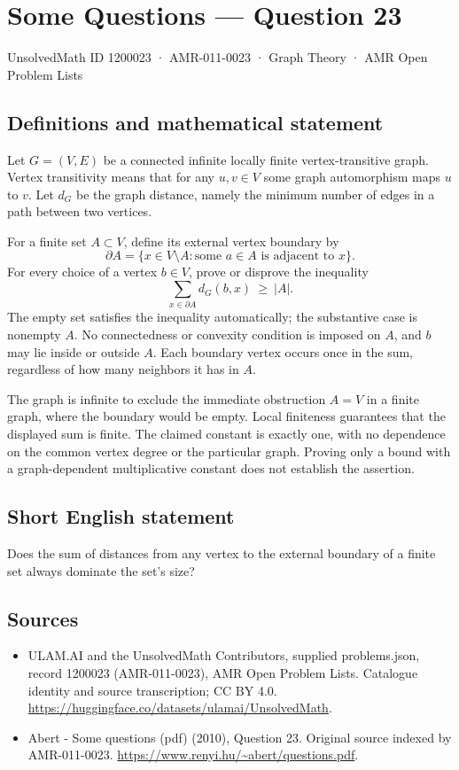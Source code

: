 \documentclass[11pt,a4paper]{article}
\begin{document}
\section*{Some Questions — Question 23}\label{1200023}
{\small UnsolvedMath ID 1200023 · AMR-011-0023 · Graph Theory · AMR Open Problem Lists}
\subsection{Definitions and mathematical statement}
Let $G=(V,E)$ be a connected infinite locally finite vertex-transitive graph. Vertex transitivity means that for any $u,v\in V$ some graph automorphism maps $u$ to $v$. Let $d_G$ be the graph distance, namely the minimum number of edges in a path between two vertices.

For a finite set $A\subset V$, define its external vertex boundary by
\[
 \partial A=\{x\in V\setminus A:\text{some }a\in A\text{ is adjacent to }x\}.
\]
For every choice of a vertex $b\in V$, prove or disprove the inequality
\[
 \sum_{x\in\partial A}d_G(b,x)\ \geq\ |A|.
\]
The empty set satisfies the inequality automatically; the substantive case is nonempty $A$. No connectedness or convexity condition is imposed on $A$, and $b$ may lie inside or outside $A$. Each boundary vertex occurs once in the sum, regardless of how many neighbors it has in $A$.

The graph is infinite to exclude the immediate obstruction $A=V$ in a finite graph, where the boundary would be empty. Local finiteness guarantees that the displayed sum is finite. The claimed constant is exactly one, with no dependence on the common vertex degree or the particular graph. Proving only a bound with a graph-dependent multiplicative constant does not establish the assertion.
\subsection{Short English statement}
Does the sum of distances from any vertex to the external boundary of a finite set always dominate the set’s size?
\subsection{Sources}
\begin{itemize}
\item[S1] ULAM.AI and the UnsolvedMath Contributors, supplied problems.json, record 1200023 (AMR-011-0023), AMR Open Problem Lists. Catalogue identity and source transcription; CC BY 4.0.
\url{https://huggingface.co/datasets/ulamai/UnsolvedMath}.
\item[S2] Abert - Some questions (pdf) (2010), Question 23. Original source indexed by AMR-011-0023.
\url{https://www.renyi.hu/~abert/questions.pdf}.
\end{itemize}
\end{document}
